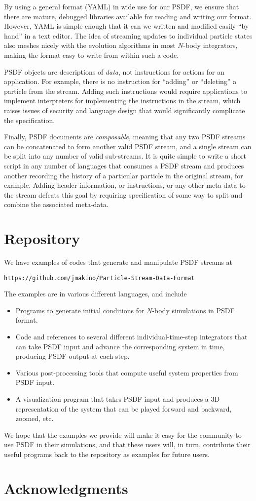 \documentclass[5p,authoryear]{elsarticle}
\begin{document}
By using a general format (YAML) in wide use for our PSDF, we ensure
that there are mature, debugged libraries available for reading and
writing our format.  However, YAML is simple enough that it can we
written and modified easily ``by hand'' in a text editor.  The idea of
streaming updates to individual particle states also meshes nicely
with the evolution algorithms in most $N$-body integrators, making the
format easy to write from within such a code.

PSDF objects are descriptions of \emph{data}, not instructions for
actions for an application.  For example, there is no instruction for
``adding'' or ``deleting'' a particle from the stream.  Adding such
instructions would require applications to implement interpreters for
implementing the instructions in the stream, which raises issues of
security and language design that would significantly complicate the
specification.

Finally, PSDF documents are \emph{composable}, meaning that any two
PSDF streams can be concatenated to form another valid PSDF stream,
and a single stream can be split into any number of valid sub-streams.
It is quite simple to write a short script in any number of languages
that consumes a PSDF stream and produces another recording the history
of a particular particle in the original stream, for example.  Adding
header information, or instructions, or any other meta-data to the
stream defeats this goal by requiring specification of some way to
split and combine the associated meta-data.

\section{Repository}

We have examples of codes that generate and manipulate PSDF streams at 
\begin{verbatim}
https://github.com/jmakino/Particle-Stream-Data-Format
\end{verbatim}
The examples are in various different languages, and include
\begin{itemize}
\item Programs to generate initial conditions for $N$-body simulations
  in PSDF format.
\item Code and references to several different individual-time-step
  integrators that can take PSDF input and advance the corresponding
  system in time, producing PSDF output at each step.
\item Various post-processing tools that compute useful system
  properties from PSDF input.
\item A visualization program that takes PSDF input and produces a 3D
  representation of the system that can be played forward and
  backward, zoomed, etc.
\end{itemize}
We hope that the examples we provide will make it easy for the
community to use PSDF in their simulations, and that these users will,
in turn, contribute their useful programs back to the repository as
examples for future users.

\section*{Acknowledgments}



\end{document}
